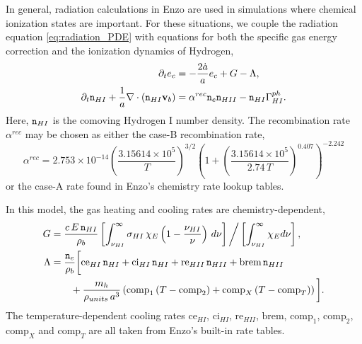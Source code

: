 \documentclass[letterpaper,10pt]{article}
\renewcommand{\(}{\left(}
\renewcommand{\)}{\right)}
\newcommand{\vb}{{\bf v}_b}
\newcommand{\rhob}{\rho_b}
\newcommand{\mn}{{\tt n}}
\begin{document}
In general, radiation calculations in Enzo are used in simulations
where chemical ionization states are important.  For these situations, 
we couple the radiation equation \eqref{eq:radiation_PDE} with
equations for both the specific gas energy correction and the
ionization dynamics of Hydrogen,
\begin{align}
  \notag
  \partial_t e_c &= -\frac{2\dot{a}}{a}e_c + G - \Lambda, \\
  \label{eq:hydrogen_ionization}
  \partial_t \mn_{HI} + \frac{1}{a}\nabla\cdot\(\mn_{HI}\vb\) &=
    \alpha^{rec} \mn_e \mn_{HII} - \mn_{HI} \Gamma_{HI}^{ph}. 
\end{align}
Here, $\mn_{HI}$ is the comoving Hydrogen I number density.  The
recombination rate $\alpha^{rec}$ may be chosen as either the case-B
recombination rate, 
\begin{equation}
\label{eq:alphaB}
\alpha^{rec} = 2.753\times 10^{-14} \left(\frac{3.15614\times 10^5}{T}\right)^{3/2} 
                   \left(1+\left(\frac{3.15614\times 10^5}{2.74\, T}\right)^{0.407}\right)^{-2.242} 
\end{equation}
or the case-A rate found in Enzo's chemistry rate lookup tables.

In this model, the gas heating and cooling rates are
chemistry-dependent, 
\begin{align}
  \label{eq:G_nLTE}
  G &= \frac{c\,E\,\mn_{HI}}{\rhob} 
    \left[\int_{\nu_{HI}}^{\infty} \sigma_{HI}\, \chi_E
    \left(1-\frac{\nu_{HI}}{\nu}\right)\, d\nu\right] \bigg/
    \left[\int_{\nu_{HI}}^{\infty} \chi_E d\nu\right], \\
\label{eq:Lambda_nLTE}
  \Lambda &= \frac{\mn_e}{\rhob}\bigg[\text{ce}_{HI}\, \mn_{HI} 
  + \text{ci}_{HI}\, \mn_{HI} + \text{re}_{HII}\, \mn_{HII} + \text{brem}\,
  \mn_{HII} \\
  \notag &\qquad+ \frac{m_h}{\rho_{units}\, a^3} \left(\text{comp}_1\, (T-\text{comp}_2) 
    + \text{comp}_{X}\, (T-\text{comp}_{T})\right) \bigg].
\end{align}
The temperature-dependent cooling rates
$\text{ce}_{HI}$, $\text{ci}_{HI}$, $\text{re}_{HII}$, $\text{brem}$,
$\text{comp}_1$, $\text{comp}_2$, $\text{comp}_{X}$ and
$\text{comp}_{T}$ are all taken from Enzo's built-in rate tables.
\end{document}
